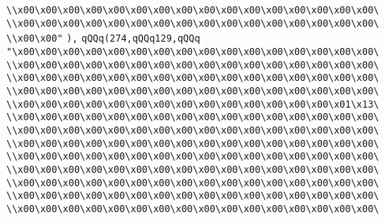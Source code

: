\verb|\\x00\x00\x00\x00\x00\x00\x00\x00\x00\x00\x00\x00\x00\x00\x00\x00\|\newline
\verb|\\x00\x00\x00\x00\x00\x00\x00\x00\x00\x00\x00\x00\x00\x00\x00\x00\|\newline
\verb|\\x00\x00"|\newline
\verb|),|\newline
\verb|qQQq(274,qQQq129,qQQq|\newline
\verb|"\x00\x00\x00\x00\x00\x00\x00\x00\x00\x00\x00\x00\x00\x00\x00\x00\|\newline
\verb|\\x00\x00\x00\x00\x00\x00\x00\x00\x00\x00\x00\x00\x00\x00\x00\x00\|\newline
\verb|\\x00\x00\x00\x00\x00\x00\x00\x00\x00\x00\x00\x00\x00\x00\x00\x00\|\newline
\verb|\\x00\x00\x00\x00\x00\x00\x00\x00\x00\x00\x00\x00\x00\x00\x00\x00\|\newline
\verb|\\x00\x00\x00\x00\x00\x00\x00\x00\x00\x00\x00\x00\x00\x00\x01\x13\|\newline
\verb|\\x00\x00\x00\x00\x00\x00\x00\x00\x00\x00\x00\x00\x00\x00\x00\x00\|\newline
\verb|\\x00\x00\x00\x00\x00\x00\x00\x00\x00\x00\x00\x00\x00\x00\x00\x00\|\newline
\verb|\\x00\x00\x00\x00\x00\x00\x00\x00\x00\x00\x00\x00\x00\x00\x00\x00\|\newline
\verb|\\x00\x00\x00\x00\x00\x00\x00\x00\x00\x00\x00\x00\x00\x00\x00\x00\|\newline
\verb|\\x00\x00\x00\x00\x00\x00\x00\x00\x00\x00\x00\x00\x00\x00\x00\x00\|\newline
\verb|\\x00\x00\x00\x00\x00\x00\x00\x00\x00\x00\x00\x00\x00\x00\x00\x00\|\newline
\verb|\\x00\x00\x00\x00\x00\x00\x00\x00\x00\x00\x00\x00\x00\x00\x00\x00\|\newline
\verb|\\x00\x00\x00\x00\x00\x00\x00\x00\x00\x00\x00\x00\x00\x00\x00\x00\|\newline

